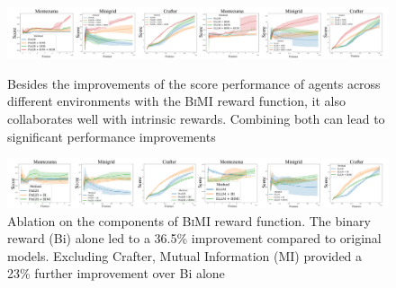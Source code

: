 \documentclass{article}
\theoremstyle{plain}
\theoremstyle{definition}
\theoremstyle{remark}
\begin{document}
\begin{figure}[h]
    \centering
    \begin{minipage}{1.0\textwidth}
        \centering
        \includegraphics[width=\textwidth]{figures/main_result_lineplot_score_clear.png}
        \caption{Besides the improvements of the score performance of agents across different environments with the \textsc{BiMI} reward function, it also collaborates well with intrinsic rewards. Combining both can lead to significant performance improvements}
        \label{fig:main_result_lineplot_score}
    \end{minipage}
    \begin{minipage}{1.0\textwidth}
        \centering
        \includegraphics[width=\textwidth]{figures/ablation_bi_bimi_lineplot_score_clear.png}
        \caption{Ablation on the components of \textsc{BiMI} reward function. The binary reward (Bi) alone led to a 36.5\% improvement compared to original models. Excluding Crafter, Mutual Information (MI) provided a 23\% further improvement over Bi alone}
        \label{fig:ablation_bi_bimi_lineplot_score}
    \end{minipage}
\end{figure}
\end{document}

